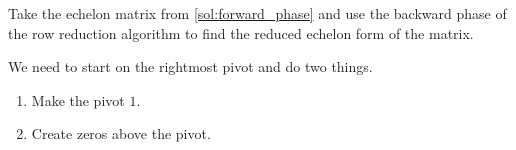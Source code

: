 \begin{question}
  \label{qst:backward_phase}

  Take the echelon matrix from \cref{sol:forward_phase} and use the
  backward phase of the row reduction algorithm to find the reduced echelon
  form of the matrix.
\end{question}

\begin{solution}
  \label{sol:backward_phase}

  We need to start on the rightmost pivot and do two things.
  \begin{enumerate}
    \label{enum:backward_phase}

    \item Make the pivot $1$.
    \item Create zeros above the pivot.
  \end{enumerate}


\end{solution}
